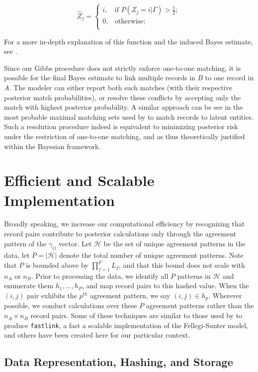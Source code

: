 \documentclass[12pt,letterpaper]{article}
\newcommand{\1}[1]{\mathbb{I}\!\left[#1\right]} %
\begin{document}
\[\hat{Z}_j =\begin{cases} 
	i,  & \text{if } P(Z_j = i |\Gamma) > \frac{1}{2}; \\
	0,  & \text{otherwise} ; \\
\end{cases}\]

For a more in-depth explanation of this function and the induced Bayes
estimate, see \citep{sadinle2017}.

Since our Gibbs procedure does not strictly enforce one-to-one matching,
it is possible for the final Bayes estimate to link multiple records in
\(B\) to one record in \(A\). The modeler can either report both such
matches (with their respective posterior match probabilities), or
resolve these conflicts by accepting only the match with highest
posterior probability. A similar approach can be see in the most probable maximal matching sets used by \citep{steorts_2013} to match records to latent entities. Such a resolution procedure indeed is equivalent
to minimizing posterior risk under the restriction of one-to-one
matching, and as thus theoretically justified within the Bayesian
framework.

\section{Efficient and Scalable Implementation}
\label{sec:efficiency}
Broadly speaking, we increase our computational efficiency by
recognizing that record pairs contribute to posterior calculations only
through the agreement pattern of the \(\gamma_{ij}\) vector. Let
\(\mathcal{H}\) be the set of unique agreement patterns in the data, let
\(P = |\mathcal{H}|\) denote the total number of unique agreement
patterns.  Note that \(P\) is bounded above by \(\prod_{f=1}^F L_f\), and
that this bound does not scale with \(n_A\) or \(n_B\). Prior to
processing the data, we identify all \(P\) patterns in \(\mathcal{H}\)
and enumerate them \(h_1, \ldots, h_P\), and map record pairs to this hashed value. When the \((i,j)\) pair
exhibits the \(p^{th}\) agreement pattern, we say \((i,j) \in h_p\).
Wherever possible, we conduct calculations over these \(P\) agreement
patterns rather than the \(n_A \times n_B\) record pairs. Some of these techniques are similar to those used by \citep{enamorado2019} to produce \texttt{fastlink}, a fast a scalable implementation of the Fellegi-Sunter model, and others have been created here for our particular context. 

\hypertarget{data-representation-hashing-and-storage}{%
	\subsection{Data Representation, Hashing, and
		Storage}\label{data-representation-hashing-and-storage}}
\end{document}

